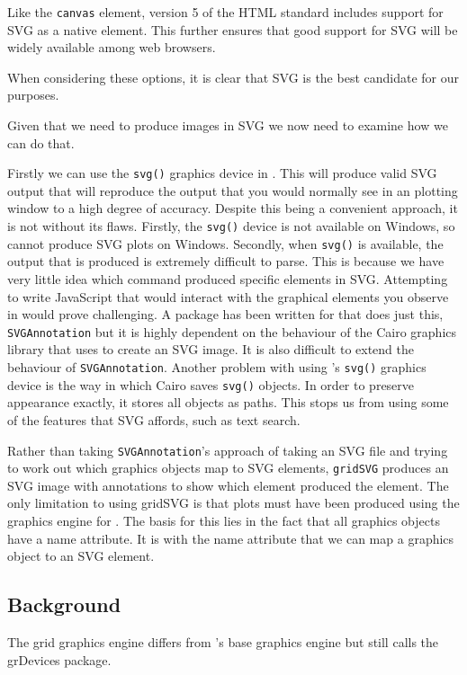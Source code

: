 Like the \texttt{canvas} element, version 5 of the HTML standard includes support for SVG as a native element.
This further ensures that good support for SVG will be widely available among web browsers.

When considering these options, it is clear that SVG is the best candidate for our purposes.

Given that we need to produce images in SVG we now need to examine how we can do that.

Firstly we can use the \texttt{svg()} graphics device in \R{}.
This will produce valid SVG output that will reproduce the output that you would normally see in an \R{} plotting window to a high degree of accuracy.
Despite this being a convenient approach, it is not without its flaws.
Firstly, the \texttt{svg()} device is not available on Windows, so \R{} cannot produce SVG plots on Windows.
Secondly, when \texttt{svg()} is available, the output that is produced is extremely difficult to parse.
This is because we have very little idea which \R{} command produced specific elements in SVG.
Attempting to write JavaScript that would interact with the graphical elements you observe in \R{} would prove challenging.
A package has been written for \R{} that does just this, \texttt{SVGAnnotation} \citet{SVGAnnotation} but it is highly dependent on the behaviour of the Cairo graphics library that \R{} uses to create an SVG image.
It is also difficult to extend the behaviour of \texttt{SVGAnnotation}.
Another problem with using \R{}'s \texttt{svg()} graphics device is the way in which Cairo saves \texttt{svg()} objects.
In order to preserve appearance exactly, it stores all objects as paths.
This stops us from using some of the features that SVG affords, such as text search.

Rather than taking \texttt{SVGAnnotation}'s approach of taking an SVG file and
trying to work out which \R{} graphics objects map to SVG elements,
\texttt{gridSVG} produces an SVG image with annotations to show which element
produced the element.
The only limitation to using gridSVG is that plots must have been produced using the \grid{} graphics engine for \R{}.
The basis for this lies in the fact that all \grid{} graphics objects have a name attribute.
It is with the name attribute that we can map a graphics object to an SVG element.

\subsection{Background}

The grid graphics engine differs from \R{}'s base graphics engine but still calls the grDevices package.
